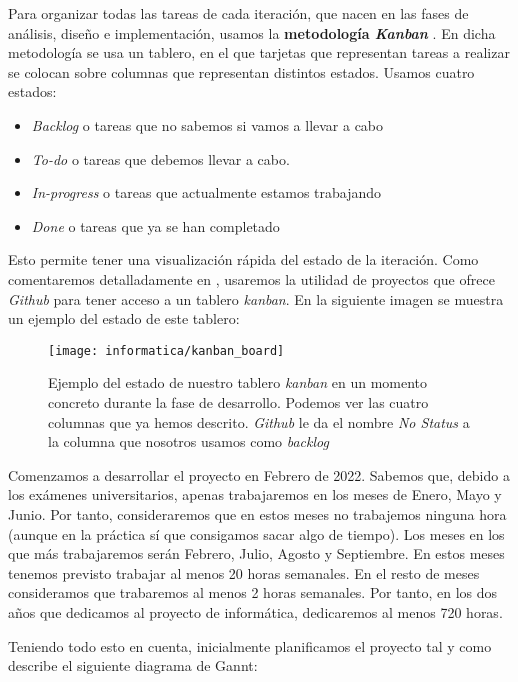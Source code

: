 Para organizar todas las tareas de cada iteración, que nacen en las fases de análisis, diseño e implementación, usamos la \textbf{metodología \textit{Kanban}} \cite{informatica:kanban_paper}. En dicha metodología se usa un tablero, en el que tarjetas que representan tareas a realizar se colocan sobre columnas que representan distintos estados. Usamos cuatro estados:

\begin{itemize}
	\item \textit{Backlog} o tareas que no sabemos si vamos a llevar a cabo
	\item \textit{To-do} o tareas que debemos llevar a cabo.
	\item \textit{In-progress} o tareas que actualmente estamos trabajando
	\item \textit{Done} o tareas que ya se han completado
\end{itemize}

Esto permite tener una visualización rápida del estado de la iteración. Como comentaremos detalladamente en , usaremos la utilidad de proyectos que ofrece \textit{Github} para tener acceso a un tablero \textit{kanban}. En la siguiente imagen se muestra un ejemplo del estado de este tablero:

\begin{figure}[H]
	\centering
	\texttt{[image: informatica/kanban\_board]}
	\caption{Ejemplo del estado de nuestro tablero \textit{kanban} en un momento concreto durante la fase de desarrollo. Podemos ver las cuatro columnas que ya hemos descrito. \textit{Github} le da el nombre \textit{No Status} a la columna que nosotros usamos como \textit{backlog}}
\end{figure}

Comenzamos a desarrollar el proyecto en Febrero de 2022. Sabemos que, debido a los exámenes universitarios, apenas trabajaremos en los meses de Enero, Mayo y Junio. Por tanto, consideraremos que en estos meses no trabajemos ninguna hora (aunque en la práctica sí que consigamos sacar algo de tiempo). Los meses en los que más trabajaremos serán Febrero, Julio, Agosto y Septiembre. En estos meses tenemos previsto trabajar al menos 20 horas semanales. En el resto de meses consideramos que trabaremos al menos 2 horas semanales. Por tanto, en los dos años que dedicamos al proyecto de informática, dedicaremos al menos 720 horas.

Teniendo todo esto en cuenta, inicialmente planificamos el proyecto tal y como describe el siguiente diagrama de Gannt:

